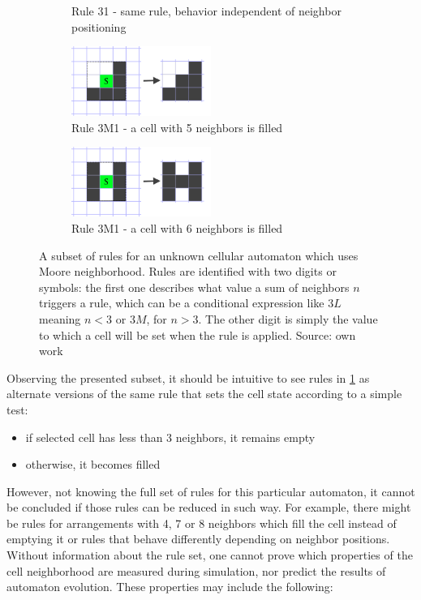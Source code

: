 \documentclass[12pt]{report}
\begin{document}
\begin{figure}[H]
\begin{subfigure}[t]{0.4\textwidth}
		\caption{Rule 31 - same rule, behavior independent of neighbor positioning} 
	\end{subfigure} \hspace{1em} 
	\begin{subfigure}[t]{0.4\textwidth}
		\centering
		\includegraphics[width=0.5\textwidth]{images/rule5alive}
		\caption{Rule 3M1 - a cell with 5 neighbors is filled} 
	\end{subfigure} \hspace{1em} 
	\begin{subfigure}[t]{0.4\textwidth}
		\centering
		\includegraphics[width=0.5\textwidth]{images/rule6alive}
		\caption{Rule 3M1 - a cell with 6 neighbors is filled} 
	\end{subfigure} 
	\caption{A subset of rules for an unknown cellular automaton which uses Moore neighborhood. Rules are identified with two digits or symbols: the first one describes what value a sum of neighbors $n$ triggers a rule, which can be a conditional expression like $3L$ meaning $n < 3$ or $3M$, for $n > 3$. The other digit is simply the value to which a cell will be set when the rule is applied. Source: own work}
	\label{fig:examplecarules}
\end{figure}

Observing the presented subset, it should be intuitive to see rules in \cref{fig:examplecarules} as alternate versions of the same rule that sets the cell state according to a simple test: 
\begin{itemize}
	\item if selected cell has less than 3 neighbors, it remains empty
	\item otherwise, it becomes filled
\end{itemize} 

However, not knowing the full set of rules for this particular automaton, it cannot be concluded if those rules can be reduced in such way. For example, there might be rules for arrangements with 4, 7 or 8 neighbors which fill the cell instead of emptying it or rules that behave differently depending on neighbor positions. Without information about the rule set, one cannot prove which properties of the cell neighborhood are measured during simulation, nor predict the results of automaton evolution. These properties may include the following:
\end{document}
